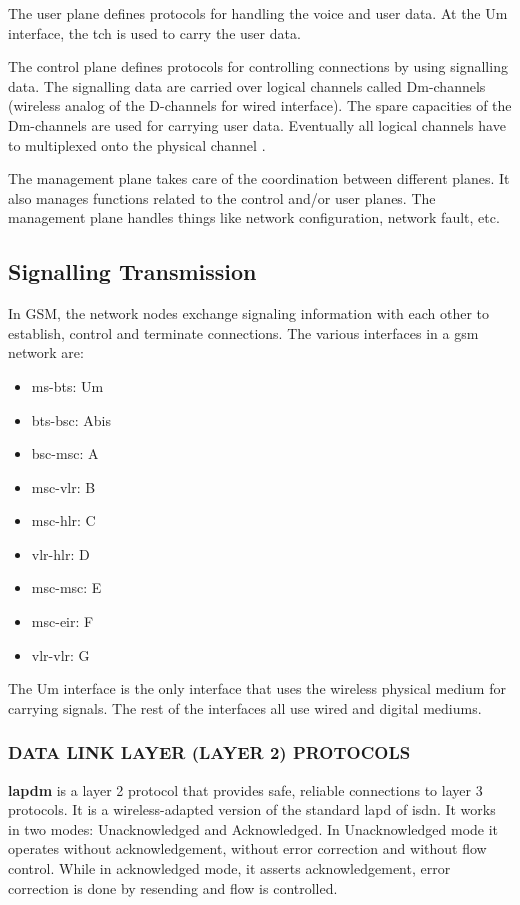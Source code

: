 The user plane defines protocols for handling the voice and user data. 
At the Um interface, the \gls{tch} is used to carry the 
user data.

The control plane defines protocols for controlling connections by using 
signalling data.
The signalling data are carried over logical channels called Dm-channels 
(wireless analog of the D-channels for wired interface).
The spare capacities of the Dm-channels are used for carrying user data.
Eventually all logical channels have to multiplexed onto the physical channel \cite{arcadaFi3}.

The management plane takes care of the coordination between different planes.
It also manages functions related to the control and/or user planes.
The management plane handles things like network configuration, network fault,
etc.


\subsection{Signalling Transmission}
In GSM, the network nodes exchange signaling information with each other to
establish, control and terminate connections.
The various interfaces in a \gls{gsm} network are:
\begin{itemize}[noitemsep,topsep=0pt,parsep=0pt,partopsep=0pt]
 \item \gls{ms}-\gls{bts}: Um
 \item \gls{bts}-\gls{bsc}: Abis
 \item \gls{bsc}-\gls{msc}: A
 \item \gls{msc}-\gls{vlr}: B
 \item \gls{msc}-\gls{hlr}: C
 \item \gls{vlr}-\gls{hlr}: D
 \item \gls{msc}-\gls{msc}: E
 \item \gls{msc}-\gls{eir}: F
 \item \gls{vlr}-\gls{vlr}: G
\end{itemize}

The Um interface is the only interface that uses the wireless physical medium 
for carrying signals. The rest of the interfaces all use wired and digital 
mediums.

\subsubsection{\uppercase{Data Link Layer (Layer 2) protocols}}

\textbf{\gls{lapdm}} is a layer 2 protocol that
provides safe, reliable connections to layer 3 protocols. It is a 
wireless-adapted version of 
 the standard \gls{lapd} of \gls{isdn}. It works in 
 two modes: Unacknowledged and Acknowledged. In Unacknowledged mode it 
 operates without acknowledgement,
 without error correction and without flow control. While in acknowledged 
 mode, it asserts acknowledgement, error correction is done by resending and 
 flow is controlled.
 
